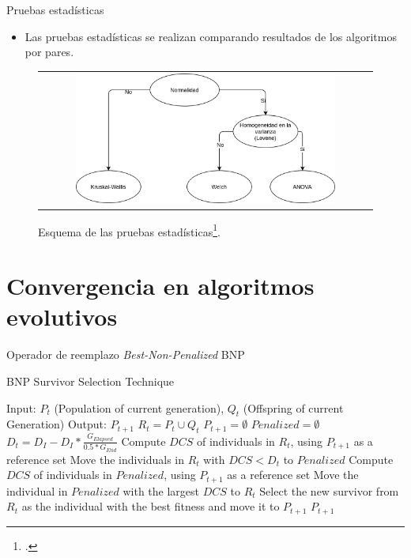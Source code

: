 \documentclass{beamer}
\begin{document}
\begin{frame}{Pruebas estadísticas}
\begin{itemize}
\item Las pruebas estadísticas se realizan comparando resultados de los algoritmos por pares.
\end{itemize}
\begin{figure}[H]
\begin{tabular}{c}
\includegraphics[width=0.8\textwidth]{Tests.png}
\end{tabular}
\centering
\caption{\scriptsize Esquema de las pruebas estadísticas\footcite{Joel:StatisticalTest}.}
\end{figure}

\end{frame}


\section{Convergencia en algoritmos evolutivos}

\begin{frame}{Operador de reemplazo \textit{Best-Non-Penalized} BNP}
\begin{algorithm}[H]
\caption{BNP Survivor Selection Technique} 
\begin{scriptsize}
\begin{algorithmic}
\STATE Input: $P_t$ (Population of current generation), $Q_t$ (Offspring of current Generation)
   	\STATE Output: $P_{t+1}$ 
        \STATE $R_t = P_t \cup Q_t$ 
        \STATE $P_{t+1} = \emptyset$ 
        \STATE $Penalized = \emptyset$ 
				\STATE $D_t = D_I - D_I * \frac{G_{Elapsed}}{0.5*G_{End}}$
         \label{alg:6}
					\STATE Compute $DCS$ of individuals in $R_t$, using $P_{t+1}$ as a reference set
					\STATE Move the individuals in $R_t$ with $DCS < D_t$ to $Penalized$
        	 \label{alg:9}
						\STATE Compute $DCS$ of individuals in $Penalized$, using $P_{t+1}$ as a reference set
						\STATE Move the individual in $Penalized$ with the largest $DCS$ to $R_t$
        	\ENDIF
					\STATE Select the new survivor from $R_t$ as the individual with the best fitness  and move it to $P_{t+1}$
        \ENDWHILE
    	\RETURN $P_{t+1}$ \label{alg:14}
\end{algorithmic}
\end{scriptsize}
\end{algorithm}
\end{frame}
\end{document}

